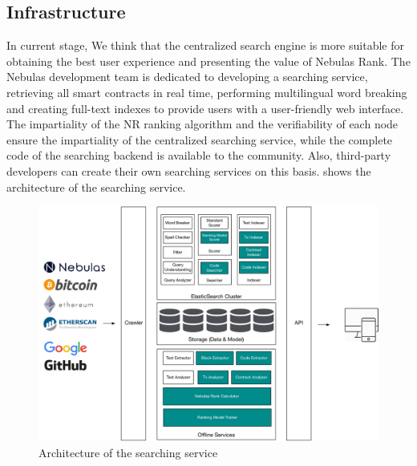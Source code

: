 \subsection{Infrastructure}

In current stage, We think that the centralized search engine is more suitable for obtaining the best user experience and presenting the value of Nebulas Rank. The Nebulas development team is dedicated to developing a searching service, retrieving all smart contracts in real time, performing multilingual word breaking and creating full-text indexes to provide users with a user-friendly web interface. The impartiality of the NR ranking algorithm and the verifiability of each node ensure the impartiality of the centralized searching service, while the complete code of the searching backend is available to the community. Also, third-party developers can create their own searching services on this basis.  shows the architecture of the searching service.

\begin{figure}[h]
\centering
\includegraphics[width=16cm]{./figs/search-arch-new}
\caption{Architecture of the searching service}
\label{fig:search-arch}
\end{figure}

